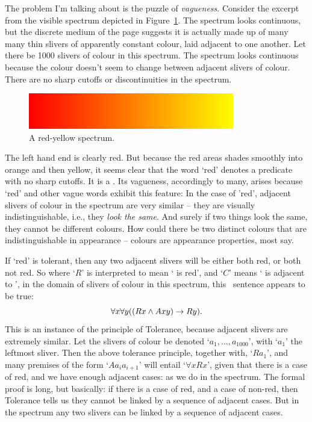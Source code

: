The problem I'm talking about is the puzzle of \emph{vagueness}. Consider the excerpt from the visible spectrum depicted in Figure~\ref{spectrum}. The spectrum looks continuous, but the discrete medium of the page suggests it is actually made up of many many thin slivers of apparently constant colour, laid adjacent to one another. Let there be 1000 slivers of colour in this spectrum. The spectrum looks continuous because the colour doesn't seem to change between adjacent slivers of colour. There are no sharp cutoffs or discontinuities in the spectrum.

\begin{figure}
\centering
\includegraphics[keepaspectratio,width=0.8\textwidth]{spectrum.png}
\caption{A red-yellow spectrum. \label{spectrum}}
\end{figure}

The left hand end is clearly red. But because the red areas shades smoothly into orange and then yellow, it seems clear that the word `red' denotes a predicate with no sharp cutoffs. It is a . Its vagueness, accordingly to many, arises because `red' and other vague words exhibit this feature: 
In the case of 'red', adjacent slivers of colour in the spectrum are very similar – they are visually indistinguishable, i.e., they \emph{look the same}. And surely if two things look the same, they cannot be different colours. How could there be two distinct colours that are indistinguishable in appearance – colours are appearance properties, most say.

If `red' is tolerant, then any two adjacent slivers will be either both red, or both not red.  So where `$R$' is interpreted to mean ` is red', and `$C$' means ` is adjacent to ', in the domain of slivers of colour in this spectrum, this \FOL\ sentence appears to be true: 
     $$\forall x \forall y ((Rx \wedge Axy) \rightarrow Ry).$$
This is an instance of the principle of Tolerance, because adjacent slivers are extremely similar. Let the slivers of colour be denoted `$a_{1},…,a_{1000}$', with `$a_{1}$' the leftmost sliver. Then the above tolerance principle, together with, `$Ra_{1}$', and many premises of the form `$Aa_{i}a_{i+1}$' will entail `$\forall x Rx$', given that there is a case of red, and we have enough adjacent cases: as we do in the spectrum.  The formal proof is long, but basically: if there is a case of red, and a case of non-red, then Tolerance tells us they cannot be linked by a sequence of adjacent cases. But in the spectrum any two slivers can be linked by a sequence of adjacent cases. 


